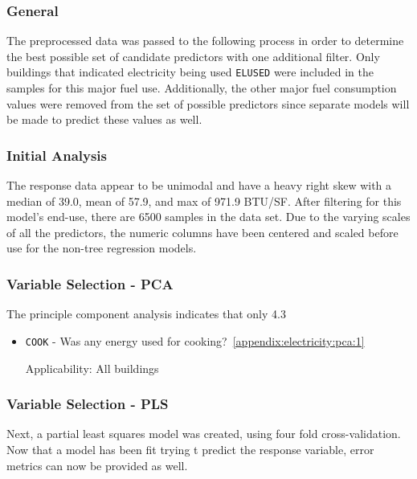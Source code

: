 \subsubsection*{General}

The preprocessed data was passed to the following process in order to determine the best possible set of candidate predictors with one additional filter.  Only buildings that indicated electricity being used \lstinline{ELUSED} were included in the samples for this major fuel use.  Additionally, the other major fuel consumption values were removed from the set of possible predictors since separate models will be made to predict these values as well.
\subsubsection*{Initial Analysis}
The response data appear to be unimodal and have a heavy right skew with a median of 39.0, mean of 57.9, and max of 971.9 BTU/SF.  After filtering for this model's end-use, there are 6500 samples in the data set.  Due to the varying scales of all the predictors, the numeric columns have been centered and scaled before use for the non-tree regression models.

\subsubsection*{Variable Selection - PCA}

The principle component analysis indicates that only 4.3%

\begin{itemize}
\item \lstinline{COOK} - Was any energy used for cooking?~\ref{appendix:electricity:pca:1}

Applicability: All buildings 

\end{itemize}

\subsubsection*{Variable Selection - PLS}

Next, a partial least squares model was created, using four fold cross-validation.  Now that a model has been fit trying t predict the response variable, error metrics can now be provided as well.  